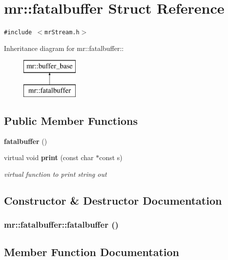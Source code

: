 \section{mr::fatalbuffer Struct Reference}
\label{structmr_1_1fatalbuffer}
{\tt \#include $<$mr\-Stream.h$>$}

Inheritance diagram for mr::fatalbuffer::\begin{figure}[H]
\begin{center}
\leavevmode
\includegraphics[height=2cm]{structmr_1_1fatalbuffer}
\end{center}
\end{figure}
\subsection*{Public Member Functions}
\begin{CompactItemize}
\item 
{\bf fatalbuffer} ()
\item 
virtual void {\bf print} (const char $\ast$const s)
\begin{CompactList}\small\item\em virtual function to print string out \item\end{CompactList}\end{CompactItemize}


\subsection{Constructor \& Destructor Documentation}
\subsubsection{\setlength{\rightskip}{0pt plus 5cm}mr::fatalbuffer::fatalbuffer ()\hspace{0.3cm}{\tt  [inline]}}\label{structmr_1_1fatalbuffer_a0}




\subsection{Member Function Documentation}
